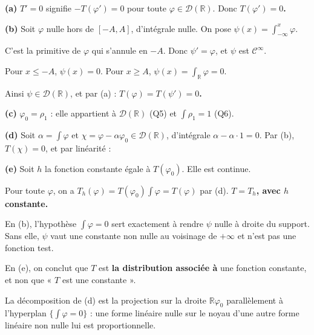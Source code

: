 \documentclass[11pt,a4paper]{article}
\newcommand{\equationajustee}[1]{%
  \sbox{\boiteequation}{$\displaystyle #1$}%
  \ifdim\wd\boiteequation>\linewidth
    \[\resizebox{\linewidth}{!}{\usebox{\boiteequation}}\]%
  \else
    \[#1\]%
  \fi}
\begin{document}
\textbf{(a)} \(T'=0\) signifie \(-T(\varphi')=0\) pour toute \(\varphi\in\mathcal D(\mathbb R)\). Donc \textbf{\(T(\varphi')=0\).}

\textbf{(b)} Soit \(\varphi\) nulle hors de \([-A,A]\), d'intégrale nulle. On pose \(\psi(x)=\int_{-\infty}^x\varphi\).

C'est la primitive de \(\varphi\) qui s'annule en \(-A\). Donc \(\psi'=\varphi\), et \(\psi\) est \(\mathcal C^\infty\).

Pour \(x\leqslant-A\), \(\psi(x)=0\). Pour \(x\geqslant A\), \(\psi(x)=\int_{\mathbb R}\varphi=0\).

Ainsi \(\psi\in\mathcal D(\mathbb R)\), et par (a) : \textbf{\(T(\varphi)=T(\psi')=0\).}

\textbf{(c)} \(\varphi_0=\rho_1\) : elle appartient à \(\mathcal D(\mathbb R)\) (Q5) et \(\int\rho_1=1\) (Q6).

\textbf{(d)} Soit \(\alpha=\int\varphi\) et \(\chi=\varphi-\alpha\varphi_0\in\mathcal D(\mathbb R)\), d'intégrale \(\alpha-\alpha\cdot1=0\). Par (b), \(T(\chi)=0\), et par linéarité :
\equationajustee{\boxed{T(\varphi)=T(\varphi_0)\int_{-\infty}^{+\infty}\varphi(t)\,\mathrm dt}}

\textbf{(e)} Soit \(h\) la fonction constante égale à \(T(\varphi_0)\). Elle est continue.

Pour toute \(\varphi\), on a \(T_h(\varphi)=T(\varphi_0)\int\varphi=T(\varphi)\) par (d). \textbf{\(T=T_h\), avec \(h\) constante.}

\begin{piege}

En (b), l'hypothèse \(\int\varphi=0\) sert exactement à rendre \(\psi\) nulle à droite du support. Sans elle, \(\psi\) vaut une constante non nulle au voisinage de \(+\infty\) et n'est pas une fonction test.

En (e), on conclut que \(T\) est \textbf{la distribution associée à} une fonction constante, et non que « \(T\) est une constante ».

\end{piege}

\begin{methode}

La décomposition de (d) est la projection sur la droite \(\mathbb R\varphi_0\) parallèlement à l'hyperplan \(\{\int\varphi=0\}\) : une forme linéaire nulle sur le noyau d'une autre forme linéaire non nulle lui est proportionnelle.

\end{methode}
\end{document}
